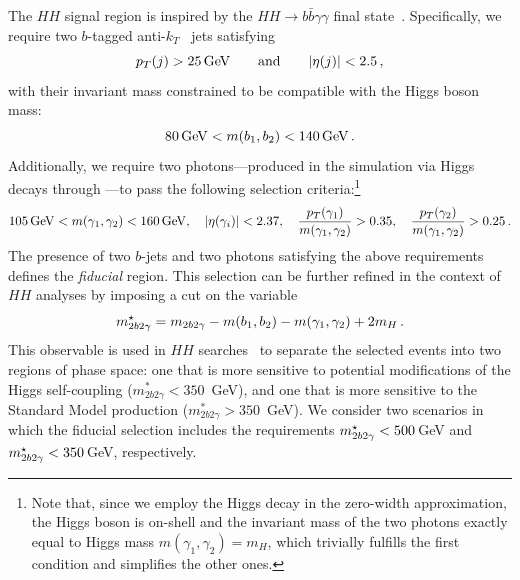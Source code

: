 \documentclass[11pt,a4paper]{article}
\begin{document}
The $HH$ signal region is inspired by the $HH \to b\bar{b}\gamma\gamma$ final state~\cite{HDBS-2021-10,CMS-HIG-19-018}. Specifically, we require two $b$-tagged anti-$k_T$~\cite{Cacciari:2005hq,Cacciari:2008gp,Cacciari:2011ma} jets satisfying
\begin{equation}
\label{eq:ptjcuts}
p_T(j) > 25\,\mathrm{GeV} \qquad {\rm and} \qquad |\eta(j)| < 2.5\,,
\end{equation}
with their invariant mass constrained to be compatible with the Higgs boson mass:
\begin{equation}
    \label{eq:mbjcut}
    80\,\mathrm{GeV} < m(b_1,b_2)< 140\,\mathrm{GeV}\,.
\end{equation}
Additionally, we require two photons—produced in the simulation via Higgs decays through —to pass the following selection criteria:\footnote{Note that, since
we employ the Higgs decay in the zero-width approximation, the Higgs boson is on-shell and the invariant mass of the two photons exactly equal to Higgs mass
$m(\gamma_1, \gamma_2)=m_H$, which trivially fulfills the first condition and simplifies the other ones.}
\begin{equation}
\label{eq:photoncuts}
    105\,\mathrm{GeV} < m(\gamma_1, \gamma_2) < 160\,\mathrm{GeV}, \quad |\eta(\gamma_i)|< 2.37, \quad
    \frac{p_T(\gamma_1)}{m(\gamma_1, \gamma_2)} > 0.35, \quad \frac{p_T(\gamma_2)}{m(\gamma_1, \gamma_2)} > 0.25\,.
\end{equation}
The presence of two $b$-jets and two photons satisfying the above requirements defines the \emph{fiducial} region. This selection can be further refined in the context of $HH$ analyses by imposing a cut on the variable
\begin{equation}
\label{eq:mbbggs}
    m_{2b2\gamma}^{\star} = m_{2b2\gamma} - m(b_1,b_2) - m(\gamma_1,\gamma_2) + 2m_H \,.
\end{equation}
This observable is used in $HH$ searches~\cite{HDBS-2021-10,HDBS-2019-27,CMS-HIG-19-018,ATLAS:2025hhd} to separate the selected events into two regions of phase space: one that is more sensitive to potential modifications of the Higgs self-coupling ($m_{2b2\gamma}^{*} < 350$~GeV), and one that is more sensitive to the Standard Model production ($m_{2b2\gamma}^{*} > 350$~GeV). We consider two scenarios in which the fiducial selection includes the requirements $m_{2b2\gamma}^{\star} < 500$\,GeV and $m_{2b2\gamma}^{\star} < 350$\,GeV, respectively. 
\end{document}
